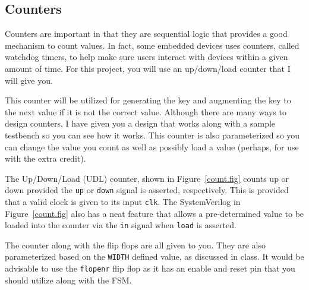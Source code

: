 \documentclass{article}
\begin{document}
\subsection{Counters}

Counters are important in that they are sequential logic that provides
a good mechanism to count values.  In fact, some embedded devices uses
counters, called watchdog timers, to help make sure users interact
with devices within a given amount of time.  For this project,  you
will use an up/down/load counter that I will give you.

This counter
will be utilized for generating the key and augmenting the key to the
next value if it is not the correct value.  Although there are many
ways to design counters, I have given you a design that works along
with a sample testbench so you can see how it works.
This counter is also parameterized so you can change the value you
count as well as possibly load a value (perhaps, for use with the
extra credit).

The Up/Down/Load (UDL) counter, shown in Figure~\ref{count.fig} counts
up or down provided the \verb!up! or \verb!down! signal is asserted, respectively.
This is provided that a valid clock is given to its input \verb!clk!.
The SystemVerilog in Figure~\ref{count.fig} also has a neat feature
that allows a pre-determined value to be loaded into the counter via
the \verb!in! signal when \verb!load! is asserted.

The counter along with the flip flops are all given to you.  They are
also parameterized based on the \verb!WIDTH! defined value, as
discussed in class.  It would be advisable to use the \verb!flopenr!
flip flop as it has an enable and reset pin that you should utilize
along with the FSM.
\end{document}

